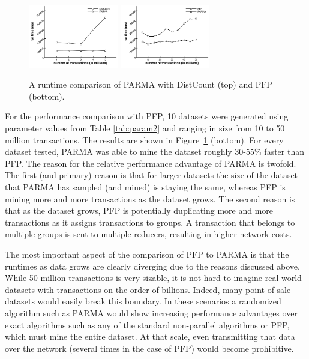 \begin{figure}[tb]
  \centering
    \includegraphics[width=0.35\textwidth]{parma/distributed_counting}
    \includegraphics[width=0.35\textwidth]{parma/performance}
  \caption{A runtime comparison of PARMA with DistCount (top) and PFP (bottom).}
\label{fig:performance}
\end{figure}

For the performance comparison with PFP, 10 datasets were generated
using parameter values from Table \ref{tab:param2} and ranging in size
from 10 to 50 million transactions.
The results are shown in
Figure~\ref{fig:performance} (bottom).
  For every dataset tested, PARMA was able
to mine the dataset roughly 30-55\% faster than PFP. The reason for the
relative performance advantage of PARMA is twofold. The first (and
primary) reason is that for larger datasets the size of the dataset that
PARMA has sampled (and mined) is staying the same, whereas PFP is mining
more and more transactions as the dataset grows. The second reason is
that as the dataset grows, PFP is potentially duplicating more and more
transactions as it assigns transactions to groups. A transaction that
belongs to multiple groups is sent to multiple reducers, resulting in
higher network costs.

The most important aspect of the comparison of PFP to PARMA is that the
runtimes as data grows are clearly diverging due to the reasons
discussed above. While 50 million transactions is very sizable, it is
not hard to imagine real-world datasets with transactions on the order
of billions. Indeed, many point-of-sale datasets would easily break this
boundary. In these scenarios a randomized algorithm such as PARMA would
show increasing performance advantages over exact algorithms such as any
of the standard non-parallel algorithms or PFP, which must mine the
entire dataset. At that scale, even transmitting that data over the
network (several times in the case of PFP) would become prohibitive.

